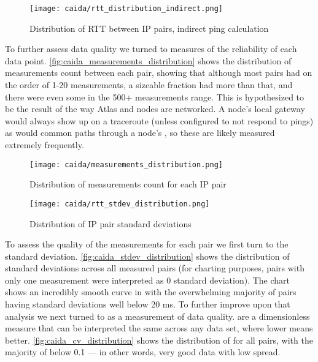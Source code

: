 \begin{figure}[H]
    \centering
    \texttt{[image: caida/rtt\_distribution\_indirect.png]}
    \caption{Distribution of RTT between IP pairs, indirect ping calculation}
    \label{fig:caida_rtt_distribution_indirect}
\end{figure}

To further assess data quality we turned to measures of the reliability of each data point. \autoref{fig:caida_measurements_distribution} shows the distribution of measurements count between each \ip pair, showing that although most \ip pairs had on the order of 1-20 measurements, a sizeable fraction had more than that, and there were even some in the 500+ measurements range. This is hypothesized to be the result of the way \ripe Atlas and \caida nodes are networked. A node's local gateway would always show up on a \gls{traceroute} (unless configured to not respond to pings) as would common paths through a node's \isp, so these \ips are likely measured extremely frequently.

\begin{figure}[H]
    \centering
    \texttt{[image: caida/measurements\_distribution.png]}
    \caption{Distribution of measurements count for each IP pair}
    \label{fig:caida_measurements_distribution}
\end{figure}

\begin{figure}[H]
    \centering
    \texttt{[image: caida/rtt\_stdev\_distribution.png]}
    \caption{Distribution of IP pair standard deviations}
    \label{fig:caida_stdev_distribution}
\end{figure}

To assess the quality of the measurements for each \ip pair we first turn to the standard deviation. \autoref{fig:caida_stdev_distribution} shows the distribution of standard deviations across all measured \ip pairs (for charting purposes, pairs with only one measurement were interpreted as 0 standard deviation). The chart shows an incredibly smooth curve in with the overwhelming majority of pairs having standard deviations well below 20 ms. To further improve upon that analysis we next turned to \cvs as a measurement of data quality. \cvs are a dimensionless measure that can be interpreted the same across any data set, where lower means better. \autoref{fig:caida_cv_distribution} shows the distribution of \cvs for all \ip pairs, with the majority of \cvs below 0.1 --- in other words, very good data with low spread.

